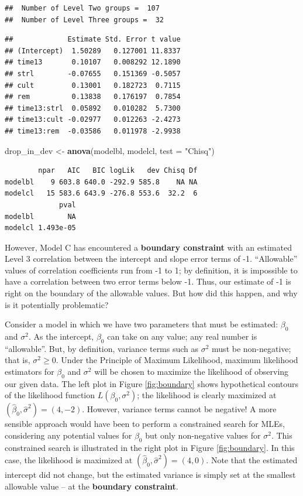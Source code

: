 \documentclass[
]{krantz}
\newenvironment{Shaded}{\begin{snugshade}}{\end{snugshade}}
\newcommand{\AttributeTok}[1]{\textcolor[rgb]{0.27,0.27,0.27}{#1}}
\newcommand{\FunctionTok}[1]{\textcolor[rgb]{0.27,0.27,0.27}{\textbf{#1}}}
\newcommand{\NormalTok}[1]{#1}
\newcommand{\OtherTok}[1]{\textcolor[rgb]{0.37,0.37,0.37}{#1}}
\newcommand{\StringTok}[1]{\textcolor[rgb]{0.5,0.5,0.5}{#1}}
\begin{document}
\begin{verbatim}
##  Number of Level Two groups =  107 
##  Number of Level Three groups =  32
\end{verbatim}

\begin{verbatim}
##             Estimate Std. Error t value
## (Intercept)  1.50289   0.127001 11.8337
## time13       0.10107   0.008292 12.1890
## strl        -0.07655   0.151369 -0.5057
## cult         0.13001   0.182723  0.7115
## rem          0.13838   0.176197  0.7854
## time13:strl  0.05892   0.010282  5.7300
## time13:cult -0.02977   0.012263 -2.4273
## time13:rem  -0.03586   0.011978 -2.9938
\end{verbatim}

\begin{Shaded}
\begin{Highlighting}[]
\NormalTok{drop\_in\_dev }\OtherTok{\textless{}{-}} \FunctionTok{anova}\NormalTok{(modelbl, modelcl, }\AttributeTok{test =} \StringTok{"Chisq"}\NormalTok{)}
\end{Highlighting}
\end{Shaded}

\begin{verbatim}
        npar   AIC   BIC logLik   dev Chisq Df
modelbl    9 603.8 640.0 -292.9 585.8    NA NA
modelcl   15 583.6 643.9 -276.8 553.6  32.2  6
             pval
modelbl        NA
modelcl 1.493e-05
\end{verbatim}

However, Model C has encountered a \textbf{boundary constraint}  with an estimated Level 3 correlation between the intercept and slope error terms of -1. ``Allowable'' values of correlation coefficients run from -1 to 1; by definition, it is impossible to have a correlation between two error terms below -1. Thus, our estimate of -1 is right on the boundary of the allowable values. But how did this happen, and why is it potentially problematic?

Consider a model in which we have two parameters that must be estimated: \(\beta_0\) and \(\sigma^2\). As the intercept, \(\beta_0\) can take on any value; any real number is ``allowable''. But, by definition, variance terms such as \(\sigma^2\) must be non-negative; that is, \(\sigma^2 \geq 0\). Under the Principle of Maximum Likelihood, maximum likelihood estimators for \(\beta_0\) and \(\sigma^2\) will be chosen to maximize the likelihood of observing our given data. The left plot in Figure \ref{fig:boundary} shows hypothetical contours of the likelihood function \(L(\beta_0, \sigma^2)\); the likelihood is clearly maximized at \((\hat{\beta}_0 , \hat{\sigma}^2)=(4,-2)\). However, variance terms cannot be negative! A more sensible approach would have been to perform a constrained search for MLEs, considering any potential values for \(\beta_0\) but only non-negative values for \(\sigma^2\). This constrained search is illustrated in the right plot in Figure \ref{fig:boundary}. In this case, the likelihood is maximized at \((\hat{\beta}_0 , \hat{\sigma}^2)=(4,0)\). Note that the estimated intercept did not change, but the estimated variance is simply set at the smallest allowable value -- at the \textbf{boundary constraint}.
\end{document}
